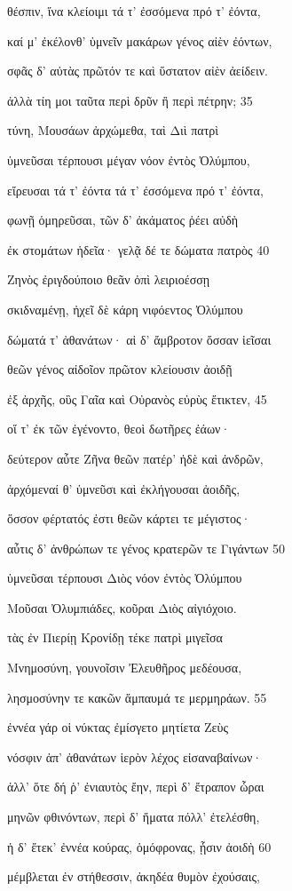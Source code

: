 θέσπιν, ἵνα κλείοιμι τά τ' ἐσσόμενα πρό τ' ἐόντα, 

καί μ' ἐκέλονθ' ὑμνεῖν μακάρων γένος αἰὲν ἐόντων,

σφᾶς δ' αὐτὰς πρῶτόν τε καὶ ὕστατον αἰὲν ἀείδειν.

ἀλλὰ τίη μοι ταῦτα περὶ δρῦν ἢ περὶ πέτρην; \num{35} 

τύνη, Μουσάων ἀρχώμεθα, ταὶ Διὶ πατρὶ

ὑμνεῦσαι τέρπουσι μέγαν νόον ἐντὸς Ὀλύμπου,

εἴρευσαι τά τ' ἐόντα τά τ' ἐσσόμενα πρό τ' ἐόντα,

φωνῇ ὁμηρεῦσαι, τῶν δ' ἀκάματος ῥέει αὐδὴ 

ἐκ στομάτων ἡδεῖα· γελᾷ δέ τε δώματα πατρὸς \num{40} 

Ζηνὸς ἐριγδούποιο θεᾶν ὀπὶ λειριοέσσῃ

σκιδναμένῃ, ἠχεῖ δὲ κάρη νιφόεντος Ὀλύμπου 

δώματά τ' ἀθανάτων· αἱ δ' ἄμβροτον ὄσσαν ἱεῖσαι 

θεῶν γένος αἰδοῖον πρῶτον κλείουσιν ἀοιδῇ

ἐξ ἀρχῆς, οὓς Γαῖα καὶ Οὐρανὸς εὐρὺς ἔτικτεν, \num{45}

οἵ τ' ἐκ τῶν ἐγένοντο, θεοὶ δωτῆρες ἐάων· 

δεύτερον αὖτε Ζῆνα θεῶν πατέρ' ἠδὲ καὶ ἀνδρῶν, 

ἀρχόμεναί θ' ὑμνεῦσι καὶ ἐκλήγουσαι ἀοιδῆς,

ὅσσον φέρτατός ἐστι θεῶν κάρτει τε μέγιστος·

αὖτις δ' ἀνθρώπων τε γένος κρατερῶν τε Γιγάντων \num{50}

ὑμνεῦσαι τέρπουσι Διὸς νόον ἐντὸς Ὀλύμπου

Μοῦσαι Ὀλυμπιάδες, κοῦραι Διὸς αἰγιόχοιο.

τὰς ἐν Πιερίῃ Κρονίδῃ τέκε πατρὶ μιγεῖσα

Μνημοσύνη, γουνοῖσιν Ἐλευθῆρος μεδέουσα,

λησμοσύνην τε κακῶν ἄμπαυμά τε μερμηράων. \num{55}

ἐννέα γάρ οἱ νύκτας ἐμίσγετο μητίετα Ζεὺς

νόσφιν ἀπ' ἀθανάτων ἱερὸν λέχος εἰσαναβαίνων·

ἀλλ' ὅτε δή ῥ' ἐνιαυτὸς ἔην, περὶ δ' ἔτραπον ὧραι

μηνῶν φθινόντων, περὶ δ' ἤματα πόλλ' ἐτελέσθη,

ἡ δ' ἔτεκ' ἐννέα κούρας, ὁμόφρονας, ᾗσιν ἀοιδὴ \num{60} 

μέμβλεται ἐν στήθεσσιν, ἀκηδέα θυμὸν ἐχούσαις,

